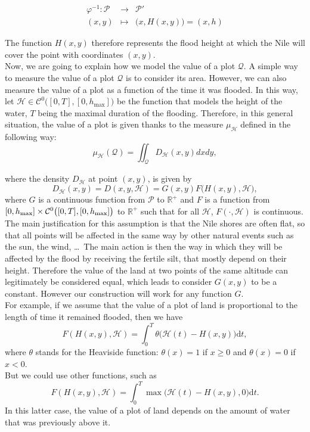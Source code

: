 \documentclass[A4paper, 12pt]{article}
\def\cC{{\mathcal{C}}}
\def\cH{\mathcal{H}}
\def\RR{{\mathbb{R}}}
\def\dd{{\mathrm{d}}}
\begin{document}
\begin{eqnarray*}\varphi^{-1}: \mathcal{P}& \longrightarrow &  \mathcal{P}'\\ 
(x,y) & \longmapsto & 
  \big(x, H(x,y) \big)=(x,h)
\end{eqnarray*}

The function $H(x,y)$ therefore represents the flood height at which the Nile will cover the point with coordinates $(x,y)$.\\




Now, we are going to explain how we model the value of a plot $\mathcal{Q}$. A simple way to measure the value of a plot $\mathcal{Q}$ is to consider its area. However, 
 we can also measure the value of a plot as a function of the time it
was flooded. In this way, let $\cH \in\cC^{0}\big([0,T],[0,h_{\max}]\big)$ be the
function that models the height of the water, $T$ being the maximal
duration of the flooding. Therefore, in this general situation, the value of a plot is given thanks to the measure $\mu_{\cH}$ defined in the following way:
\begin{equation}\label{eq:mu_h}
\mu_{\cH}(\mathcal{Q}) =\iint_{\mathcal{Q}} D_{\cH}(x,y) dxdy,
\end{equation}

where the density $D_{\cH}$ at
point $(x,y)$, is given by
\begin{equation}\label{eq:D}
D_{\cH}(x,y)=D(x,y,\cH)=G(x,y)F\big(H(x,y),\cH\big),
\end{equation}
where $G$ is a continuous function from $\mathcal{P}$ to $\RR^{+}$ 
and $F$ is a function
from\\ $[0,h_{\rm max}]\times\cC^{0}\big([0,T],[0,h_{\rm max}]\big)$ to
$\RR^{+}$ such that for all $\cH$, $F(\cdot,\cH)$ is continuous.\\



 The main
justification for this assumption is that the Nile shores are often
flat, so that all points will be affected in the same way
by other natural events such as the sun, the wind,  \dots\ The main action is
then the way in which they will be affected by the flood by receiving
the fertile silt, that mostly depend on their height. Therefore the
value of the land at two points of the same altitude can legitimately
be considered equal, which leads to consider $G(x,y)$ to be a
constant. However our construction will work for any function $G$.\\

For example, if we assume that the value of a plot of land is proportional to the length of time
it remained flooded, then we have  
$$F(H(x,y),\cH)=\int_{0}^{T}
\theta\big(\cH(t)-H(x,y)\big)\dd t,$$
 where $\theta$ stands for the Heaviside
function: $\theta(x)=1$ if $x\ge0$ and $\theta(x)=0$ if $x<0$.\\
 But we could use other functions, such as 
 $$F(H(x,y),\cH)=\int_{0}^{T} \max\big(\cH(t)-H(x,y),0\big)\dd t.$$ In
 this latter case, the value of a plot of land depends on the amount
 of water that was previously above it.
\end{document}
